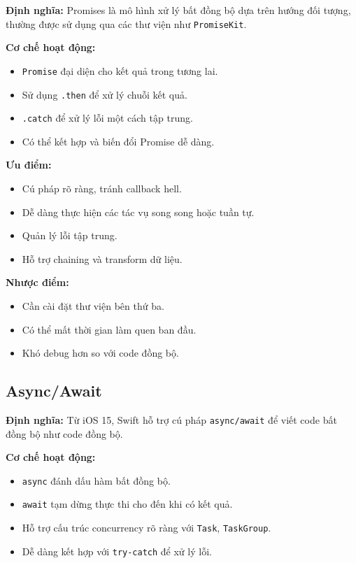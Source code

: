 \textbf{Định nghĩa:} Promises là mô hình xử lý bất đồng bộ dựa trên hướng đối tượng, thường được sử dụng qua các thư viện như \texttt{PromiseKit}.

\textbf{Cơ chế hoạt động:}
\begin{itemize}
    \item \texttt{Promise} đại diện cho kết quả trong tương lai.
    \item Sử dụng \texttt{.then} để xử lý chuỗi kết quả.
    \item \texttt{.catch} để xử lý lỗi một cách tập trung.
    \item Có thể kết hợp và biến đổi Promise dễ dàng.
\end{itemize}

\textbf{Ưu điểm:}
\begin{itemize}
    \item Cú pháp rõ ràng, tránh callback hell.
    \item Dễ dàng thực hiện các tác vụ song song hoặc tuần tự.
    \item Quản lý lỗi tập trung.
    \item Hỗ trợ chaining và transform dữ liệu.
\end{itemize}

\textbf{Nhược điểm:}
\begin{itemize}
    \item Cần cài đặt thư viện bên thứ ba.
    \item Có thể mất thời gian làm quen ban đầu.
    \item Khó debug hơn so với code đồng bộ.
\end{itemize}

\subsection{Async/Await}

\textbf{Định nghĩa:} Từ iOS 15, Swift hỗ trợ cú pháp \texttt{async/await} để viết code bất đồng bộ như code đồng bộ.

\textbf{Cơ chế hoạt động:}
\begin{itemize}
    \item \texttt{async} đánh dấu hàm bất đồng bộ.
    \item \texttt{await} tạm dừng thực thi cho đến khi có kết quả.
    \item Hỗ trợ cấu trúc concurrency rõ ràng với \texttt{Task}, \texttt{TaskGroup}.
    \item Dễ dàng kết hợp với \texttt{try-catch} để xử lý lỗi.
\end{itemize}

